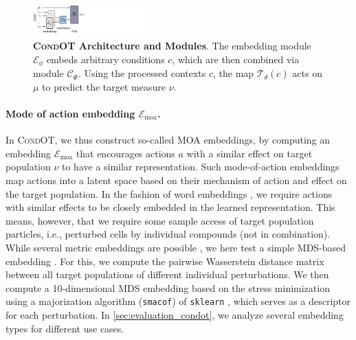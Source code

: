 \begin{figure}
    \centering
    \includegraphics[width=0.4\textwidth]{figures/fig_architecture.pdf}
    \caption{\textbf{\textsc{CondOT} Architecture and Modules}. The embedding module $\mathcal{E}_\phi$ embeds arbitrary conditions $c$, which are then combined via module $\mathcal{C}_\Phi$. Using the processed contexts $c$, the map $\mathcal{T}_\theta(c)$ acts on $\mu$ to predict the target measure $\nu$.}
    \label{fig:architecture}
\end{figure}

\paragraph{Mode of action embedding $\mathcal{E}_\text{moa}$.}
In \textsc{CondOT}, we thus construct so-called \acrfull{MOA} embeddings, by computing an embedding $\mathcal{E}_\text{moa}$ that encourages actions $a$ with a similar effect on target population $\nu$ to have a similar representation.
Such mode-of-action embeddings map actions into a latent space based on their mechanism of action and effect on the target population.
In the fashion of word embeddings \citep{mikolov2013efficient, mikolov2013distributed, mikolov2013linguistic}, we require actions with similar effects to be closely embedded in the learned representation.
This means, however, that we require some sample access of target population particles, i.e., perturbed cells by individual compounds (not in combination).
While several metric embeddings are possible \citep{chopra2005learning}, we here test a simple \acrfull{MDS}-based embedding \citep{mead1992review}.
For this, we compute the pairwise Wasserstein distance matrix between all target populations of different individual perturbations. We then compute a 10-dimensional \acrshort{MDS} embedding based on the stress minimization using a majorization algorithm (\texttt{smacof}) \citep{de2009multidimensional} of \texttt{sklearn} \citep{pedregosa2011scikit}, which serves as a descriptor for each perturbation.
In \cref{sec:evaluation_condot}, we analyze several embedding types for different use cases.

